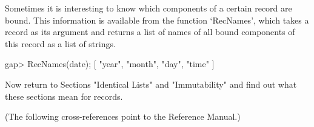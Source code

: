 Sometimes it is interesting to know which  components of a certain record
are  bound.  This information is available  from the function `RecNames',
which  takes a record as  its  argument and  returns  a list of names of
all bound components of this record as a list of strings.

\beginexample
gap> RecNames(date);
[ "year", "month", "day", "time" ]
\endexample

%

Now return to Sections "Identical Lists"  and "Immutability" and find out
what these sections mean for records.


(The following cross-references point to the {\GAP} Reference Manual.)

